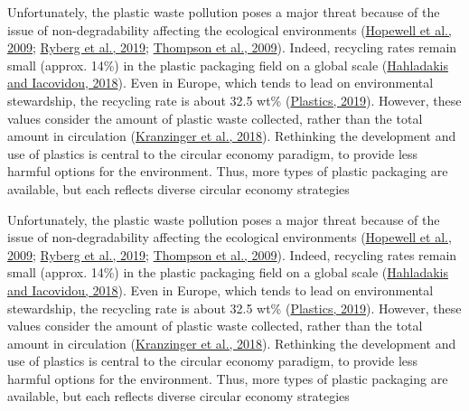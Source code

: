\documentclass[
  11pt,
]{article}
\begin{document}
Unfortunately, the plastic waste pollution poses a major threat because
of the issue of non-degradability affecting the ecological environments
(\protect\hyperlink{ref-Hopewell2009}{Hopewell et al., 2009};
\protect\hyperlink{ref-Ryberg2019}{Ryberg et al., 2019};
\protect\hyperlink{ref-Thompson2009b}{Thompson et al., 2009}). Indeed,
recycling rates remain small (approx. 14\%) in the plastic packaging
field on a global scale
(\protect\hyperlink{ref-Hahladakis2018}{Hahladakis and Iacovidou,
2018}). Even in Europe, which tends to lead on environmental
stewardship, the recycling rate is about 32.5 wt\%
(\protect\hyperlink{ref-Plastics2019}{Plastics, 2019}). However, these
values consider the amount of plastic waste collected, rather than the
total amount in circulation
(\protect\hyperlink{ref-Kranzinger2018}{Kranzinger et al., 2018}).
Rethinking the development and use of plastics is central to the
circular economy paradigm, to provide less harmful options for the
environment. Thus, more types of plastic packaging are available, but
each reflects diverse circular economy strategies

Unfortunately, the plastic waste pollution poses a major threat because
of the issue of non-degradability affecting the ecological environments
(\protect\hyperlink{ref-Hopewell2009}{Hopewell et al., 2009};
\protect\hyperlink{ref-Ryberg2019}{Ryberg et al., 2019};
\protect\hyperlink{ref-Thompson2009b}{Thompson et al., 2009}). Indeed,
recycling rates remain small (approx. 14\%) in the plastic packaging
field on a global scale
(\protect\hyperlink{ref-Hahladakis2018}{Hahladakis and Iacovidou,
2018}). Even in Europe, which tends to lead on environmental
stewardship, the recycling rate is about 32.5 wt\%
(\protect\hyperlink{ref-Plastics2019}{Plastics, 2019}). However, these
values consider the amount of plastic waste collected, rather than the
total amount in circulation
(\protect\hyperlink{ref-Kranzinger2018}{Kranzinger et al., 2018}).
Rethinking the development and use of plastics is central to the
circular economy paradigm, to provide less harmful options for the
environment. Thus, more types of plastic packaging are available, but
each reflects diverse circular economy strategies
\end{document}
